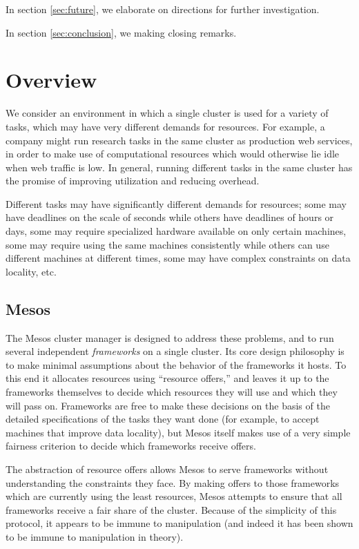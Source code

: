 \documentclass{acm_proc_article-sp}
\begin{document}
In section \ref{sec:future}, we elaborate on directions for further
investigation.

In section \ref{sec:conclusion}, we making closing remarks.

\section{Overview}
\label{sec:overview}

We consider an environment in which a single cluster is used for a variety of
tasks, which may have very different demands for resources. For example, a
company might run research tasks in the same cluster as production web services,
in order to make use of computational resources which would otherwise lie idle
when web traffic is low. In general, running different tasks in the same cluster
has the promise of improving utilization and reducing overhead. 

Different tasks may have significantly different demands for resources; some may
have deadlines on the scale of seconds while others have deadlines of hours or
days, some may require specialized hardware available on only certain machines,
some may require using the same machines consistently while others can use
different machines at different times, some may have complex constraints on data
locality, etc. 

\subsection{Mesos}
The Mesos cluster manager is designed to address these problems, and to run
several independent \emph{frameworks} on a single cluster. Its core design philosophy
is to make minimal assumptions about the behavior of the frameworks it hosts. To
this end it allocates resources using ``resource offers,'' and leaves it up to the
frameworks themselves to decide which resources they will use and which they
will pass on. Frameworks are free to make these decisions on the basis of the
detailed specifications of the tasks they want done (for example, to accept
machines that improve data locality), but Mesos itself makes use of a very
simple fairness criterion to decide which frameworks receive offers.

The abstraction of resource offers allows Mesos to serve frameworks without
understanding the constraints they face. By making offers to those frameworks
which are currently using the least resources, Mesos attempts to ensure that all
frameworks receive a fair share of the cluster. Because of the simplicity of
this protocol, it appears to be immune to manipulation (and indeed it has been
shown to be immune to manipulation in theory).
\end{document}

